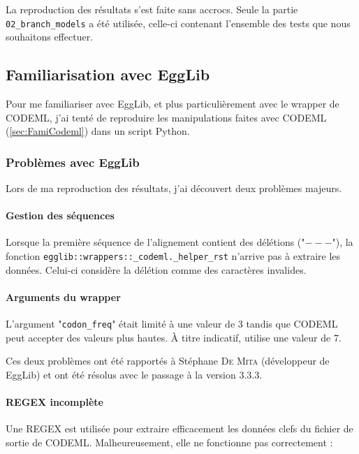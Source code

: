 \documentclass[../main]{subfiles} %
\begin{document}
La reproduction des résultats s'est faite sans accrocs. Seule la partie \lstinline{02_branch_models} a été utilisée, celle-ci contenant l'ensemble des tests que nous souhaitons effectuer.


\subsection{Familiarisation avec  \gls{EggLib}}

Pour me familiariser avec \gls{EggLib}, et plus particulièrement avec le \gls{wrapper} de \gls{CODEML}, j'ai tenté de reproduire les manipulations faites avec \gls{CODEML} (\cref{sec:FamiCodeml}) dans un script \gls{Python}.

\subsubsection{Problèmes avec \gls{EggLib}}
Lors de ma reproduction des résultats, j'ai découvert deux problèmes majeurs.

\paragraph{Gestion des séquences} Lorsque la première séquence de l'alignement contient des délétions ("$---$"), la fonction \lstinline {egglib::wrappers::_codeml._helper_rst} n'arrive pas à extraire les données. Celui-ci considère la délétion comme des caractères invalides.

\paragraph{Arguments du \gls{wrapper}} L'argument "\lstinline{codon_freq}" était limité à une valeur de 3 tandis que \gls{CODEML} peut accepter des valeurs plus hautes. À titre indicatif, \cite{alvarez-carretero_beginners_2023} utilise une valeur de 7. 

\vspace{0.5\baselineskip}
Ces deux problèmes ont été rapportés à Stéphane \textsc{De Mita} (développeur de \gls{EggLib}) et ont été résolus avec le passage à la version $3.3.3$.

\paragraph{\acrshort{REGEX} incomplète}
Une \acrshort{REGEX} est utilisée pour extraire efficacement les données clefs du fichier de sortie de \gls{CODEML}. Malheureusement, elle ne fonctionne pas correctement :
\end{document}
